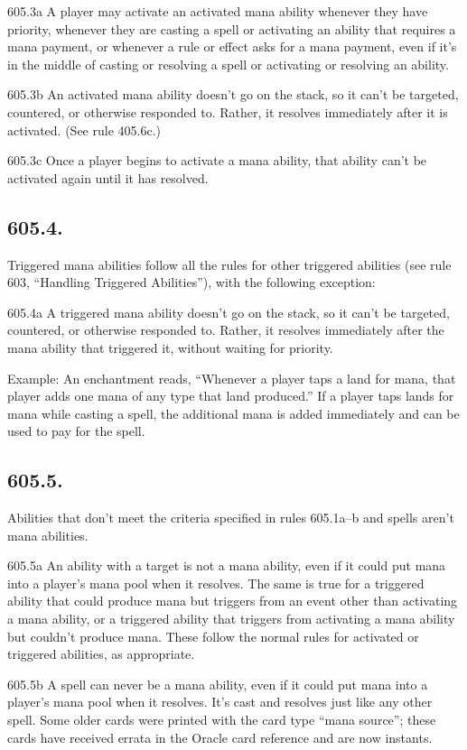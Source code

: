 605.3a A player may activate an activated mana ability whenever they have priority, whenever they are casting a spell or activating an ability that requires a mana payment, or whenever a rule or effect asks for a mana payment, even if it’s in the middle of casting or resolving a spell or activating or resolving an ability.

605.3b An activated mana ability doesn’t go on the stack, so it can’t be targeted, countered, or otherwise responded to. Rather, it resolves immediately after it is activated. (See rule 405.6c.)

605.3c Once a player begins to activate a mana ability, that ability can’t be activated again until it has resolved.

\subsection*{605.4.}
Triggered mana abilities follow all the rules for other triggered abilities (see rule 603, “Handling Triggered Abilities”), with the following exception:

605.4a A triggered mana ability doesn’t go on the stack, so it can’t be targeted, countered, or otherwise responded to. Rather, it resolves immediately after the mana ability that triggered it, without waiting for priority.

Example: An enchantment reads, “Whenever a player taps a land for mana, that player adds one mana of any type that land produced.” If a player taps lands for mana while casting a spell, the additional mana is added immediately and can be used to pay for the spell.

\subsection*{605.5.}
Abilities that don’t meet the criteria specified in rules 605.1a–b and spells aren’t mana abilities.

605.5a An ability with a target is not a mana ability, even if it could put mana into a player’s mana pool when it resolves. The same is true for a triggered ability that could produce mana but triggers from an event other than activating a mana ability, or a triggered ability that triggers from activating a mana ability but couldn’t produce mana. These follow the normal rules for activated or triggered abilities, as appropriate.

605.5b A spell can never be a mana ability, even if it could put mana into a player’s mana pool when it resolves. It’s cast and resolves just like any other spell. Some older cards were printed with the card type “mana source”; these cards have received errata in the Oracle card reference and are now instants.

